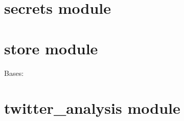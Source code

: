 \documentclass[letterpaper,10pt,english]{sphinxmanual}
\begin{document}
\section{secrets module}
\label{secrets:module-secrets}\label{secrets::doc}\label{secrets:secrets-module}

\section{store module}
\label{store:store-module}\label{store:module-store}\label{store::doc}

\begin{fulllineitems}
\label{store:store.StoreType}
Bases: 

\end{fulllineitems}


\begin{fulllineitems}
\label{store:store.get_search_tweets}
\end{fulllineitems}


\begin{fulllineitems}
\label{store:store.read}
\end{fulllineitems}


\begin{fulllineitems}
\label{store:store.save}
\end{fulllineitems}



\section{twitter\_analysis module}
\label{twitter_analysis:module-twitter_analysis}\label{twitter_analysis:twitter-analysis-module}\label{twitter_analysis::doc}
\end{document}
